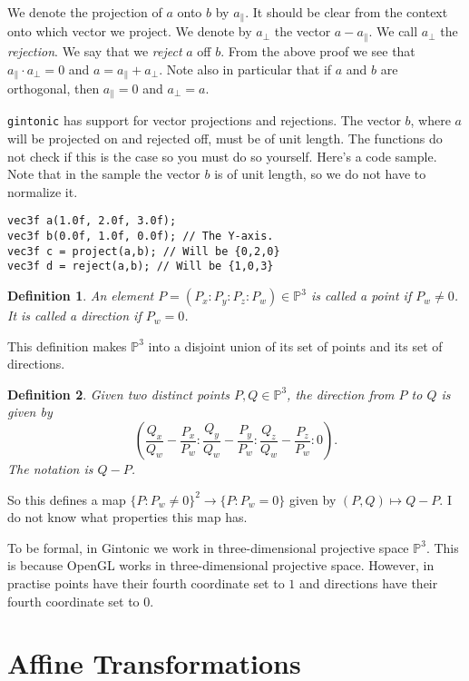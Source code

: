 \documentclass{article}
\newtheorem{definition}{Definition}
\begin{document}
We denote the projection of $a$ onto $b$ by $a_{\|}$. It should be clear from the context onto which vector we project. We denote by $a_{\perp}$ the vector $a - a_{\|}$. We call $a_{\perp}$ the \emph{rejection}. We say that we \emph{reject} $a$ off $b$. From the above proof we see that $a_{\|} \cdot a_{\perp} = 0$ and $a = a_{\|} + a_{\perp}$. Note also in particular that if $a$ and $b$ are orthogonal, then $a_{\|} = 0$ and $a_{\perp} = a$.

\texttt{gintonic} has support for vector projections and rejections. The vector $b$, where $a$ will be projected on and rejected off, must be of unit length. The functions do not check if this is the case so you must do so yourself. Here's a code sample. Note that in the sample the vector $b$ is of unit length, so we do not have to normalize it.

\begin{lstlisting}
vec3f a(1.0f, 2.0f, 3.0f);
vec3f b(0.0f, 1.0f, 0.0f); // The Y-axis.
vec3f c = project(a,b); // Will be {0,2,0}
vec3f d = reject(a,b); // Will be {1,0,3}
\end{lstlisting}

\begin{definition}
An element $P = (P_x : P_y : P_z : P_w) \in \mathbb{P}^3$ is called a \emph{point} if $P_w \neq 0$. It is called a \emph{direction} if $P_w = 0$.
\end{definition}
This definition makes $\mathbb{P}^3$ into a disjoint union of its set of points and its set of directions.

\begin{definition}
Given two distinct points $P,Q \in \mathbb{P}^3$, the \emph{direction from $P$ to $Q$} is given by
\[ \left( \frac{Q_x}{Q_w} - \frac{P_x}{P_w} :  \frac{Q_y}{Q_w} - \frac{P_y}{P_w} :  \frac{Q_z}{Q_w} - \frac{P_z}{P_w} : 0 \right). \]
The notation is $Q-P$.
\end{definition}
So this defines a map $\{P : P_w \neq 0\}^2 \to \{P : P_w = 0\}$ given by $(P,Q) \mapsto Q-P$. I do not know what properties this map has.

To be formal, in Gintonic we work in three-dimensional projective space $\mathbb{P}^3$. This is because OpenGL works in three-dimensional projective space. However, in practise points have their fourth coordinate set to $1$ and directions have their fourth coordinate set to $0$.

\section{Affine Transformations}
\end{document}
